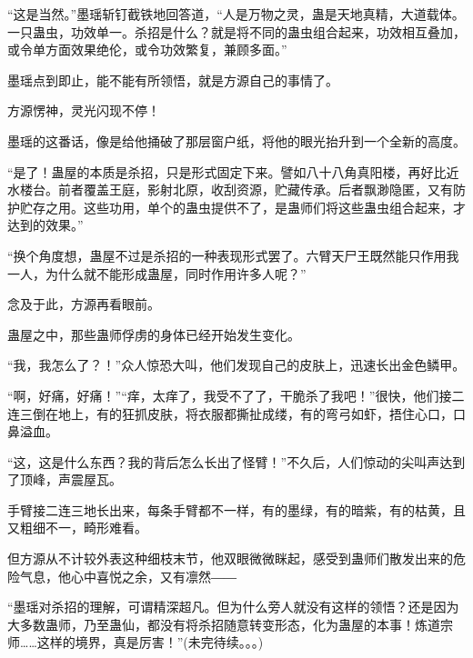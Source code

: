 \begin{this_body}
“这是当然。”墨瑶斩钉截铁地回答道，“人是万物之灵，蛊是天地真精，大道载体。一只蛊虫，功效单一。杀招是什么？就是将不同的蛊虫组合起来，功效相互叠加，或令单方面效果绝伦，或令功效繁复，兼顾多面。”

墨瑶点到即止，能不能有所领悟，就是方源自己的事情了。

方源愣神，灵光闪现不停！

墨瑶的这番话，像是给他捅破了那层窗户纸，将他的眼光抬升到一个全新的高度。

“是了！蛊屋的本质是杀招，只是形式固定下来。譬如八十八角真阳楼，再好比近水楼台。前者覆盖王庭，影射北原，收刮资源，贮藏传承。后者飘渺隐匿，又有防护贮存之用。这些功用，单个的蛊虫提供不了，是蛊师们将这些蛊虫组合起来，才达到的效果。”

“换个角度想，蛊屋不过是杀招的一种表现形式罢了。六臂天尸王既然能只作用我一人，为什么就不能形成蛊屋，同时作用许多人呢？”

念及于此，方源再看眼前。

蛊屋之中，那些蛊师俘虏的身体已经开始发生变化。

“我，我怎么了？！”众人惊恐大叫，他们发现自己的皮肤上，迅速长出金色鳞甲。

“啊，好痛，好痛！”“痒，太痒了，我受不了了，干脆杀了我吧！”很快，他们接二连三倒在地上，有的狂抓皮肤，将衣服都撕扯成缕，有的弯弓如虾，捂住心口，口鼻溢血。

“这，这是什么东西？我的背后怎么长出了怪臂！”不久后，人们惊动的尖叫声达到了顶峰，声震屋瓦。

手臂接二连三地长出来，每条手臂都不一样，有的墨绿，有的暗紫，有的枯黄，且又粗细不一，畸形难看。

但方源从不计较外表这种细枝末节，他双眼微微眯起，感受到蛊师们散发出来的危险气息，他心中喜悦之余，又有凛然――

“墨瑶对杀招的理解，可谓精深超凡。但为什么旁人就没有这样的领悟？还是因为大多数蛊师，乃至蛊仙，都没有将杀招随意转变形态，化为蛊屋的本事！炼道宗师……这样的境界，真是厉害！”(未完待续。。。)

\end{this_body}

